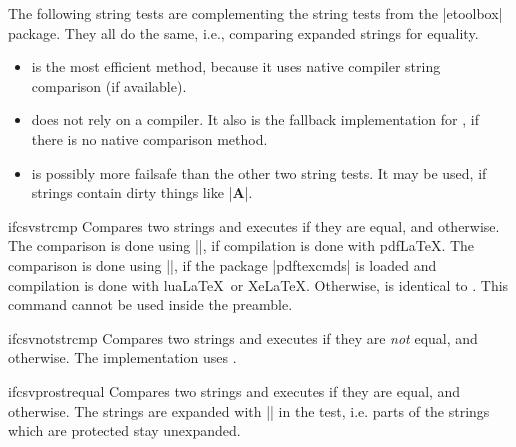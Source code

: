 \documentclass[a4paper,11pt]{ltxdoc}
\begin{document}
The following string tests are complementing the string tests
from the |etoolbox| package. They all do the same, i.e.,
comparing expanded strings for equality.
\begin{itemize}
\item{} is the most efficient method, because it uses
  native compiler string comparison (if available).
\item{} does not rely on a compiler. It also is the
  fallback implementation for , if there is no
  native comparison method.
\item{} is possibly more failsafe than the other two
  string tests. It may be used, if strings contain dirty things like |\textbf{A}|.
\end{itemize}
\medskip

\begin{docCommand}[doc new=2016-07-01]{ifcsvstrcmp}{}
  Compares two strings and executes  if they are equal, and  otherwise.
  The comparison is done using |\pdfstrcmp|, if compilation is done with pdf\LaTeX.
  The comparison is done using |\pdf@strcmp|, if the package |pdftexcmds| is
  loaded and compilation is done with lua\LaTeX\ or Xe\LaTeX.
  Otherwise,  is identical to .
  This command cannot be used inside the preamble.
\end{docCommand}


\begin{docCommand}[doc new=2016-07-01]{ifcsvnotstrcmp}{}
  Compares two strings and executes  if they are \emph{not} equal, and  otherwise.
  The implementation uses .
\end{docCommand}



\begin{docCommand}[doc new=2016-07-01]{ifcsvprostrequal}{}
  Compares two strings and executes  if they are equal, and  otherwise.
  The strings are expanded with |\protected@edef| in the test, i.e. parts of the
  strings which are protected stay unexpanded.
\end{docCommand}
\end{document}
